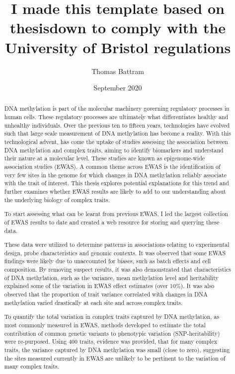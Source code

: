 \documentclass[11pt,oneside]{bristolthesis}
\title{I made this template based on thesisdown to comply with the University of Bristol regulations}
\author{Thomas Battram}
\date{September 2020}
\begin{document}
  \maketitle

\frontmatter %
\pagestyle{empty} %
  \begin{abstract}
    DNA methylation is part of the molecular machinery governing regulatory processes in human cells. These regulatory processes are ultimately what differentiates healthy and unhealthy individuals. Over the previous ten to fifteen years, technologies have evolved such that large scale measurement of DNA methylation has become a reality. With this technological advent, has come the uptake of studies assessing the association between DNA methylation and complex traits, aiming to identify biomarkers and understand their nature at a molecular level. These studies are known as epigenome-wide association studies (EWAS). A common theme across EWAS is the identification of very few sites in the genome for which changes in DNA methylation reliably associate with the trait of interest. This thesis explores potential explanations for this trend and further examines whether EWAS results are likely to add to our understanding about the underlying biology of complex traits.

    To start assessing what can be learnt from previous EWAS, I led the largest collection of EWAS results to date and created a web resource for storing and querying these data.

    These data were utilized to determine patterns in associations relating to experimental design, probe characteristics and genomic contexts. It was observed that some EWAS findings were likely due to unaccounted for biases, such as batch effects and cell composition. By removing suspect results, it was also demonstrated that characteristics of DNA methylation, such as the variance, mean methylation level and heritability explained some of the variation in EWAS effect estimates (over 10\%). It was also observed that the proportion of trait variance correlated with changes in DNA methylation varied drastically at each site and across complex traits.

    To quantify the total variation in complex traits captured by DNA methylation, as most commonly measured in EWAS, methods developed to estimate the total contribution of common genetic variants to phenotypic variation (SNP-heritability) were re-purposed. Using 400 traits, evidence was provided, that for many complex traits, the variance captured by DNA methylation was small (close to zero), suggesting the sites measured currently in EWAS are unlikely to be pertinent to the variation of many complex traits.


\end{abstract}
\end{document}
